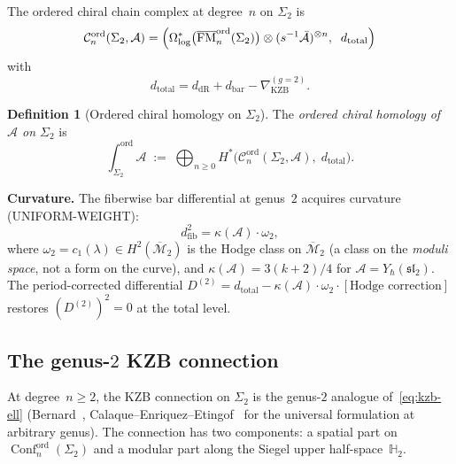 \documentclass[11pt,reqno]{amsart}
\theoremstyle{definition}
\newtheorem{definition}[theorem]{Definition}
\theoremstyle{remark}
\newcommand{\cA}{\mathcal{A}}
\newcommand{\cC}{\mathcal{C}}
\newcommand{\cM}{\mathcal{M}}
\DeclareMathOperator{\Conf}{Conf}
\DeclareMathOperator{\FM}{FM}
\newcommand{\HHH}{\mathbb{H}}
\numberwithin{equation}{section}
\begin{document}
The ordered chiral chain complex at degree~$n$ on
$\Sigma_2$ is
\begin{equation}\label{eq:g2-chiral-cx}
  \cC_n^{\mathrm{ord}}(\Sigma_2, \cA)
  = \Bigl(
  \Omega^*_{\log}\bigl(
  \overline{\FM}_n^{\mathrm{ord}}(\Sigma_2)\bigr)
  \otimes (s^{-1}\bar{\cA})^{\otimes n},
  \;\; d_{\mathrm{total}}
  \Bigr)
\end{equation}
with
\begin{equation}\label{eq:d-total-g2}
  d_{\mathrm{total}}
  = d_{\mathrm{dR}}
  + d_{\mathrm{bar}}
  - \nabla_{\mathrm{KZB}}^{(g=2)}.
\end{equation}

\begin{definition}[Ordered chiral homology on $\Sigma_2$]
\label{def:ord-ch-g2}
The \emph{ordered chiral homology of $\cA$ on $\Sigma_2$} is
\begin{equation}\label{eq:ord-ch-g2}
  \int_{\Sigma_2}^{\mathrm{ord}} \cA
  \;:=\;
  \bigoplus_{n \geq 0}
  H^*\bigl(
  \cC_n^{\mathrm{ord}}(\Sigma_2, \cA),\;
  d_{\mathrm{total}}\bigr).
\end{equation}
\end{definition}

\noindent
\textbf{Curvature.}
The fiberwise bar differential at genus~$2$ acquires
curvature (UNIFORM-WEIGHT):
\begin{equation}\label{eq:fib-curvature-g2}
  d_{\mathrm{fib}}^2 = \kappa(\cA) \cdot \omega_2,
\end{equation}
where $\omega_2 = c_1(\lambda) \in H^2(\overline{\cM}_2)$
is the Hodge class on $\overline{\cM}_2$
(a class on the \emph{moduli space}, not a form on the
curve), and $\kappa(\cA) = 3(k+2)/4$ for
$\cA = Y_\hbar(\mathfrak{sl}_2)$. The period-corrected
differential
$D^{(2)} = d_{\mathrm{total}} - \kappa(\cA) \cdot
\omega_2 \cdot [\text{Hodge correction}]$ restores
$(D^{(2)})^2 = 0$ at the total level.

\subsection{The genus-$2$ KZB connection}
\label{subsec:g2-kzb}

At degree~$n \geq 2$, the KZB connection on $\Sigma_2$
is the genus-$2$ analogue of~\eqref{eq:kzb-ell}
(Bernard~\cite{Bernard88},
Calaque--Enriquez--Etingof~\cite{CEE09} for the
universal formulation at arbitrary genus).
The connection has two components: a spatial part on
$\Conf_n^{\mathrm{ord}}(\Sigma_2)$ and a modular part
along the Siegel upper half-space~$\HHH_2$.
\end{document}
